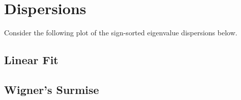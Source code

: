 %
%
%
%
%


\newpage
\section{Dispersions}

Consider the following plot of the sign-sorted eigenvalue dispersions below.

\subsection{Linear Fit}

\subsection{Wigner's Surmise}
